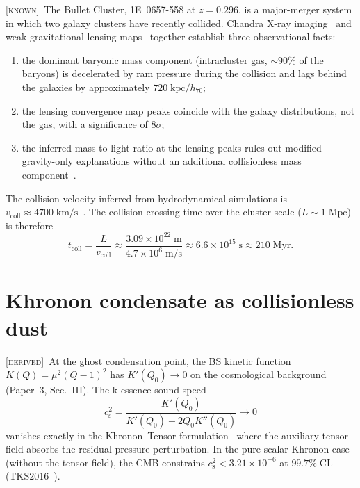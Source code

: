\documentclass[prd,twocolumn,superscriptaddress,longbibliography,floatfix]{revtex4-2}
\newcommand{\cs}{c_{\mathrm{s}}}
\newcommand{\known}{\textsc{[known]}}
\newcommand{\derived}{\textsc{[derived]}}
\begin{document}
\known\ The Bullet Cluster, 1E~0657-558 at
$z = 0.296$, is a major-merger system in which two
galaxy clusters have recently collided.  Chandra X-ray
imaging~\cite{Markevitch2002,Markevitch2004} and weak
gravitational lensing maps~\cite{Clowe2004,Clowe2006}
together establish three observational facts:
\begin{enumerate}
\item the dominant baryonic mass component (intracluster
gas, $\sim 90\%$ of the baryons) is decelerated by ram
pressure during the collision and lags behind the
galaxies by approximately $720\;\mathrm{kpc}/h_{70}$;
\item the lensing convergence map peaks coincide with
the galaxy distributions, not the gas, with a
significance of $8\sigma$;
\item the inferred mass-to-light ratio at the lensing
peaks rules out modified-gravity-only explanations
without an additional collisionless mass
component~\cite{Clowe2006,Brownstein2007}.
\end{enumerate}
The collision velocity inferred from hydrodynamical
simulations is $v_{\mathrm{coll}} \approx
4700\;\mathrm{km/s}$~\cite{Markevitch2004}.  The
collision crossing time over the cluster scale
($L \sim 1\;\mathrm{Mpc}$) is therefore
\begin{equation}
t_{\mathrm{coll}} = \frac{L}{v_{\mathrm{coll}}}
\approx \frac{3.09 \times 10^{22}\;\mathrm{m}}
              {4.7 \times 10^{6}\;\mathrm{m/s}}
\approx 6.6 \times 10^{15}\;\mathrm{s}
\approx 210\;\mathrm{Myr}.
\label{eq:tcoll}
\end{equation}

\section{Khronon condensate as collisionless dust}
\label{sec:dust}

\derived\ At the ghost condensation point, the BS
kinetic function $K(Q) = \mu^{2}(Q-1)^{2}$ has
$K'(Q_{0}) \to 0$ on the cosmological background
(Paper~3, Sec.~III).  The k-essence sound speed
\begin{equation}
\cs^{2} = \frac{K'(Q_{0})}{K'(Q_{0}) + 2Q_{0}K''(Q_{0})}
\to 0
\label{eq:cs2}
\end{equation}
vanishes exactly in the Khronon--Tensor
formulation~\cite{BS2025} where the auxiliary
tensor field absorbs the residual pressure
perturbation.  In the pure scalar Khronon case
(without the tensor field), the CMB constrains
$\cs^{2} < 3.21 \times 10^{-6}$ at
$99.7\%\;\mathrm{CL}$ (TKS2016~\cite{TKS2016}).
\end{document}
